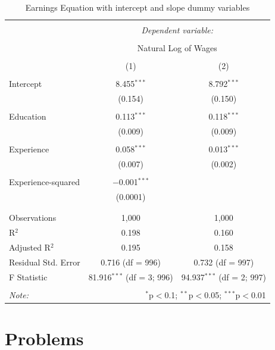 \documentclass[
]{book}
\theoremstyle{definition}
\theoremstyle{definition}
\theoremstyle{definition}
\theoremstyle{definition}
\theoremstyle{remark}
\begin{document}
\begin{table}[!htbp] \centering 
  \caption{Earnings Equation  with intercept and slope dummy variables} 
  \label{} 
\begin{tabular}{@{\extracolsep{5pt}}lcc} 
\\[-1.8ex]\hline 
\hline \\[-1.8ex] 
 & \multicolumn{2}{c}{\textit{Dependent variable:}} \\ 
\cline{2-3} 
\\[-1.8ex] & \multicolumn{2}{c}{Natural Log of Wages} \\ 
\\[-1.8ex] & (1) & (2)\\ 
\hline \\[-1.8ex] 
 Intercept & 8.455$^{***}$ & 8.792$^{***}$ \\ 
  & (0.154) & (0.150) \\ 
  & & \\ 
 Education & 0.113$^{***}$ & 0.118$^{***}$ \\ 
  & (0.009) & (0.009) \\ 
  & & \\ 
 Experience & 0.058$^{***}$ & 0.013$^{***}$ \\ 
  & (0.007) & (0.002) \\ 
  & & \\ 
 Experience-squared & $-$0.001$^{***}$ &  \\ 
  & (0.0001) &  \\ 
  & & \\ 
\hline \\[-1.8ex] 
Observations & 1,000 & 1,000 \\ 
R$^{2}$ & 0.198 & 0.160 \\ 
Adjusted R$^{2}$ & 0.195 & 0.158 \\ 
Residual Std. Error & 0.716 (df = 996) & 0.732 (df = 997) \\ 
F Statistic & 81.916$^{***}$ (df = 3; 996) & 94.937$^{***}$ (df = 2; 997) \\ 
\hline 
\hline \\[-1.8ex] 
\textit{Note:}  & \multicolumn{2}{r}{$^{*}$p$<$0.1; $^{**}$p$<$0.05; $^{***}$p$<$0.01} \\ 
\end{tabular} 
\end{table}

\hypertarget{problems-2}{%
\section*{Problems}\label{problems-2}}
\end{document}
